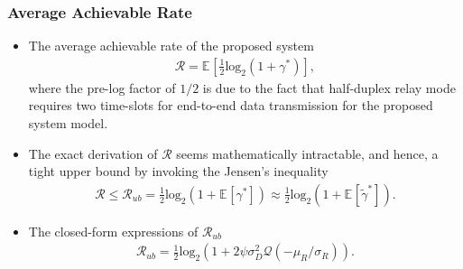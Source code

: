 \documentclass[article,mathserif,10pt,envcountsect]{beamer}
\newcommand{\E}[2][]{\mathbb{E}_{#1}\!\left[{#2}\right]}
\renewcommand{\log}[2][]{\mathrm{log}_{#1}\left(#2\right)}
\begin{document}
\begin{frame}
\frametitle{Average Achievable Rate}
\begin{itemize}	
	\item The average achievable rate of the proposed system
	\begin{eqnarray}\label{eqn:avg_rate}
	\mathcal{R} = \E{\frac{1}{2}\log[2]{1+\gamma^*}}, \nonumber
	\end{eqnarray}   
	where the pre-log factor of $1/2$ is due to the fact that half-duplex relay mode requires two time-slots for end-to-end data transmission for the proposed system model.
	
	\item The exact derivation of  $\mathcal{R}$ seems mathematically intractable, and hence,  a  tight upper bound by invoking the Jensen’s inequality 
	\begin{eqnarray}\label{eqn:rate_up_bound}
	\mathcal{R} \leq \mathcal{R}_{ub} = \frac{1}{2}\log[2]{1+ \E{\gamma^*}}\approx \frac{1}{2}\log[2]{1+ \E{\tilde {\gamma}^*}}. \nonumber
	\end{eqnarray} 
	
	
	
	\item The closed-form expressions of  $\mathcal{R}_{ub}$
	\begin{eqnarray}\label{eqn:rate_up_bound_ana}
	\!\!\!\!\!\!\!\!\!\!\mathcal{R}_{ub} =\frac{1}{2}\log[2]{1+ 2 \psi \sigma_D^2 \mathcal{Q}\left(-\mu_R/\sigma_{R}\right) }. \nonumber
	\end{eqnarray} 
\end{itemize}

\end{frame}
\end{document}
